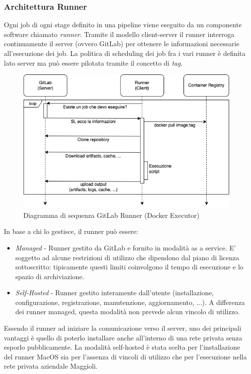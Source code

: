\subsubsection{Architettura Runner}
Ogni job di ogni stage definito in una pipeline viene eseguito da un componente software chiamato \textit{runner}. Tramite il modello client-server il runner interroga continuamente il server (ovvero GitLab) per ottenere le informazioni necessarie all'esecuzione dei job. La politica di scheduling dei job fra i vari runner è definita lato server ma può essere pilotata tramite il concetto di \textit{tag}.

\begin{figure}[H]
\centering
\includegraphics[width=1\textwidth]{img/tesi-17-runner.drawio.png}
\caption{Diagramma di sequenza GitLab Runner (Docker Executor)}
\end{figure}

In base a chi lo gestisce, il runner può essere:
\begin{itemize}
    \item \textit{Managed} - Runner gestito da GitLab e fornito in modalità as a service. E' soggetto ad alcune restrizioni di utilizzo che dipendono dal piano di licenza sottoscritto: tipicamente questi limiti coinvolgono il tempo di esecuzione e lo spazio di archiviazione.
    \item \textit{Self-Hosted} - Runner gestito interamente dall'utente (installazione, configurazione, registrazione, manutenzione, aggiornamento, ...). A differenza dei runner managed, questa modalità non prevede alcun vincolo di utilizzo.
\end{itemize}

Essendo il runner ad iniziare la comunicazione verso il server, uno dei principali vantaggi è quello di poterlo installare anche all'interno di una rete privata senza esporlo pubblicamente. La modalità self-hosted è stata scelta per l'installazione del runner MacOS sia per l'assenza di vincoli di utilizzo che per l'esecuzione nella rete privata aziendale Maggioli.

